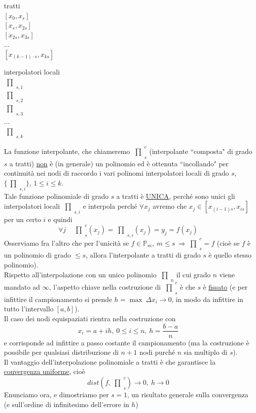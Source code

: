 \documentclass[12pt,a4paper]{article}
\newcommand{\inter}{\begin{matrix}\prod\end{matrix}}
\begin{document}
\begin{minipage}{0.33\textwidth}
\begin{center}
    tratti\\
    $[x_0, x_s]$\\
    $[x_s, x_{2s}]$\\
    $[x_{2s}, x_{3s}]$\\
    $\dotso$\\
    $[x_{(k-1) \cdot s}, x_{ks}]$
\end{center}
\end{minipage}
\begin{minipage}{0.33\textwidth}
\begin{center}
    interpolatori locali\\
    $\inter_{s,1}$\\
    $\inter_{s,2}$\\
    $\inter_{s,3}$\\
    $\dotso$\\
    $\inter_{s,k}$
\end{center}
\end{minipage}

\bigskip
La funzione interpolante, che chiameremo $\inter_s^c$ (interpolante ``composta" di grado $s$ a tratti) \uline{non} è (in generale) un polinomio ed è ottenuta ``incollando" per continuità nei nodi di raccordo i vari polinomi interpolatori locali di grado $s$, $\{ \inter_{s, i}\}$, $1 \leq i \leq k$.\\
Tale funzione polinomiale di grado $s$ a tratti è \uline{UNICA}, perché sono unici gli interpolatori locali $\inter_{s,i}$ e interpola perché $\forall x_j$ avremo che $x_j \in [x_{(i-1) s}, x_{i s}]$ per un certo $i$ e quindi
\[ \forall j \quad \inter_s^c (x_j) = \inter_{s,i} (x_j) = y_j = f(x_j) \]
Osserviamo fra l'altro che per l'unicità se $f \in \mathbb{P}_m, \ m \leq s \ \Rightarrow \inter_s^c = f$ (cioè se $f$ è un polinomio di grado $\leq s$, allora l'interpolante a tratti di grado $s$ è quello stesso polinomio).\\
Rispetto all'interpolazione con un unico polinomio $\inter_n$ il cui grado $n$ viene mandato ad $\infty$, l'aspetto chiave nella costruzione di $\inter_s^c$ è che $s$ è \uline{fissato} (e per infittire il campionamento si prende $h=\max \ \Delta x_i \to 0$, in modo da infittire in tutto l'intervallo $[a,b]$).\\
Il caso dei nodi equispaziati rientra nella costruzione con
\[ x_i = a+ih, \ 0 \leq i \leq n, \ h = \frac{b-a}{n} \]
e corrisponde ad infittire a passo costante il campionamento (ma la costruzione è possibile per qualsiasi distribuzione di $n+1$ nodi purché $n$ sia multiplo di $s$).\\
Il vantaggio dell'interpolazione polinomiale a tratti è che garantisce la \uline{convergenza uniforme}, cioè 
\[ dist(f, \inter_{s}^{c}) \to 0, \ h \to 0 \]
Enunciamo ora, e dimostriamo per $s=1$, un risultato generale sulla convergenza (e sull'ordine
di infinitesimo dell'errore in $h$)
\end{document}
